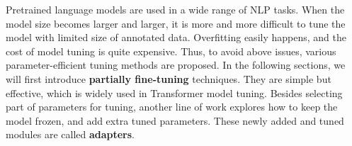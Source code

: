 Pretrained language models are used in a wide range of NLP tasks. When the model size becomes larger and larger, it is more and more difficult to tune the model with limited size of annotated data. 
Overfitting easily happens, and the cost of model tuning is quite expensive.
Thus, to avoid above issues, various parameter-efficient tuning methods are proposed.
%
In the following sections, we will first introduce \textbf{partially fine-tuning}  techniques. They are simple but effective, which is widely used in Transformer model tuning.
Besides selecting part of parameters for tuning, another line of work explores how to keep the model frozen, and add extra tuned parameters. These newly added and tuned modules are called \textbf{adapters}.